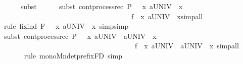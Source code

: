 \begin{isabellebody}
\ \ \ \ \isamarkupfalse%
{\isacharparenleft}{\kern0pt}subst\ {\isacharasterisk}{\kern0pt}{\isacharparenright}{\kern0pt}\isanewline
\ \ \ \ \isamarkupfalse%
{\isacharparenleft}{\kern0pt}subst\ cont{\isacharunderscore}{\kern0pt}process{\isacharunderscore}{\kern0pt}rec{\isacharbrackleft}{\kern0pt}\ P\ {\isacharequal}{\kern0pt}\ {\isacartoucheopen}{\isacharparenleft}{\kern0pt}{\isasymmu}\ x{\isachardot}{\kern0pt}\ {\isasymsqinter}a{\isasymin}UNIV\ {\isasymrightarrow}\ x{\isacharparenright}{\kern0pt}{\isacartoucheclose}\ \isanewline
\ \ \ \ \ \ \ \ \ \ \ \ \ \ \ \ \ \ \ \ \ \ \ \ \ \ \ \ \ \ \ \ \ \ \ \ f\ {\isacharequal}{\kern0pt}\ {\isacartoucheopen}{\isasymlambda}x{\isachardot}{\kern0pt}\ {\isasymsqinter}a{\isasymin}UNIV\ {\isasymrightarrow}\ x{\isacartoucheclose}{\isacharbrackright}{\kern0pt}{\isacharcomma}{\kern0pt}simp{\isacharunderscore}{\kern0pt}all{\isacharparenright}{\kern0pt}\isanewline
\ \ \ \ \isamarkupfalse%
{\isacharparenleft}{\kern0pt}rule\ fix{\isacharunderscore}{\kern0pt}ind{\isacharbrackleft}{\kern0pt}\ F\ {\isacharequal}{\kern0pt}\ {\isacartoucheopen}{\isacharparenleft}{\kern0pt}{\isasymLambda}\ x{\isachardot}{\kern0pt}\ {\isasymsqinter}a{\isasymin}UNIV\ {\isasymrightarrow}\ x{\isacharparenright}{\kern0pt}{\isacartoucheclose}{\isacharbrackright}{\kern0pt}{\isacharcomma}{\kern0pt}\ simp{\isacharcomma}{\kern0pt}simp{\isacharparenright}{\kern0pt}\ \isanewline
\ \ \ \ \ \isamarkupfalse%
{\isacharparenleft}{\kern0pt}subst\ cont{\isacharunderscore}{\kern0pt}process{\isacharunderscore}{\kern0pt}rec{\isacharbrackleft}{\kern0pt}\ P\ {\isacharequal}{\kern0pt}\ {\isacartoucheopen}{\isacharparenleft}{\kern0pt}{\isasymmu}\ x{\isachardot}{\kern0pt}\ {\isasymsqinter}a{\isasymin}UNIV\ {\isasymrightarrow}\ {\isasymsqinter}a{\isasymin}UNIV\ {\isasymrightarrow}\ x{\isacharparenright}{\kern0pt}{\isacartoucheclose}\ \isanewline
\ \ \ \ \ \ \ \ \ \ \ \ \ \ \ \ \ \ \ \ \ \ \ \ \ \ \ \ \ \ \ \ \ \ \ \ \ f\ {\isacharequal}{\kern0pt}\ {\isacartoucheopen}{\isasymlambda}x{\isachardot}{\kern0pt}\ {\isasymsqinter}a{\isasymin}UNIV\ {\isasymrightarrow}\ {\isasymsqinter}a{\isasymin}UNIV\ {\isasymrightarrow}\ x{\isacartoucheclose}{\isacharbrackright}{\kern0pt}{\isacharcomma}{\kern0pt}\ simp{\isacharunderscore}{\kern0pt}all{\isacharparenright}{\kern0pt}\isanewline
\ \ \ \ \ \isamarkupfalse%
{\isacharparenleft}{\kern0pt}rule\ mono{\isacharunderscore}{\kern0pt}Mndetprefix{\isacharunderscore}{\kern0pt}FD{\isacharcomma}{\kern0pt}\ simp{\isacharparenright}{\kern0pt}\ \isanewline

\end{isabellebody}
